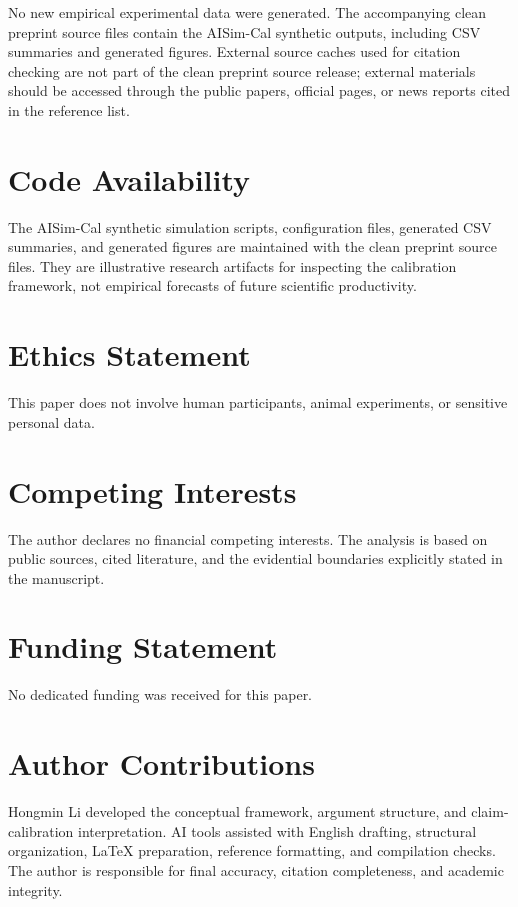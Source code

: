 \documentclass[11pt,a4paper]{article}
\begin{document}
No new empirical experimental data were generated. The accompanying clean preprint source files contain the AISim-Cal synthetic outputs, including CSV summaries and generated figures. External source caches used for citation checking are not part of the clean preprint source release; external materials should be accessed through the public papers, official pages, or news reports cited in the reference list.

\section*{Code Availability}

The AISim-Cal synthetic simulation scripts, configuration files, generated CSV summaries, and generated figures are maintained with the clean preprint source files. They are illustrative research artifacts for inspecting the calibration framework, not empirical forecasts of future scientific productivity.

\section*{Ethics Statement}

This paper does not involve human participants, animal experiments, or sensitive personal data.

\section*{Competing Interests}

The author declares no financial competing interests. The analysis is based on public sources, cited literature, and the evidential boundaries explicitly stated in the manuscript.

\section*{Funding Statement}

No dedicated funding was received for this paper.

\section*{Author Contributions}

Hongmin Li developed the conceptual framework, argument structure, and claim-calibration interpretation. AI tools assisted with English drafting, structural organization, LaTeX preparation, reference formatting, and compilation checks. The author is responsible for final accuracy, citation completeness, and academic integrity.
\end{document}
